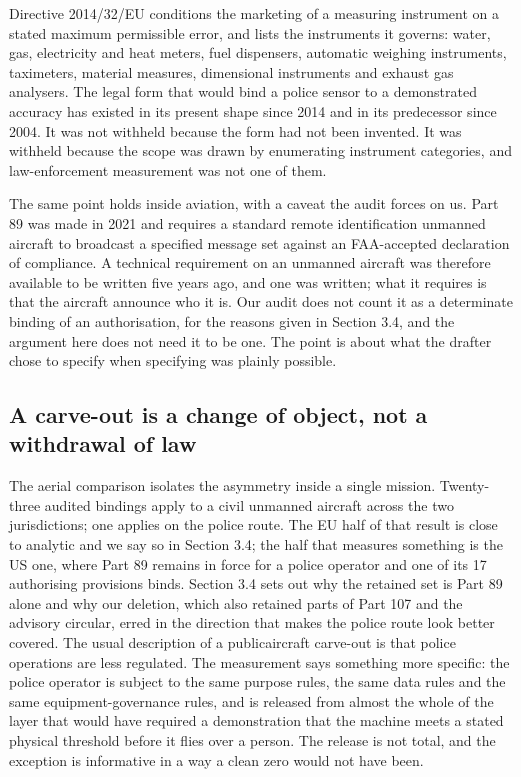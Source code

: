 Directive 2014/32/EU conditions the marketing of a measuring instrument on a stated maximum permissible error, and lists the instruments it governs: water, gas, electricity and heat meters, fuel dispensers, automatic weighing instruments, taximeters, material measures, dimensional instruments and exhaust gas analysers. The legal form that would bind a police sensor to a demonstrated accuracy has existed in its present shape since 2014 and in its predecessor since 2004. It was not withheld because the form had not been invented. It was withheld because the scope was drawn by enumerating instrument categories, and law-enforcement measurement was not one of them.

The same point holds inside aviation, with a caveat the audit forces on us. Part 89 was made in 2021 and requires a standard remote identification unmanned aircraft to broadcast a specified message set against an FAA-accepted declaration of compliance. A technical requirement on an unmanned aircraft was therefore available to be written five years ago, and one was written; what it requires is that the aircraft announce who it is. Our audit does not count it as a determinate binding of an authorisation, for the reasons given in Section 3.4, and the argument here does not need it to be one. The point is about what the drafter chose to specify when specifying was plainly possible.

\subsection{A carve-out is a change of object, not a withdrawal of law}\label{sec:4.3}

The aerial comparison isolates the asymmetry inside a single mission. Twenty-three audited bindings apply to a civil unmanned aircraft across the two jurisdictions; one applies on the police route. The EU half of that result is close to analytic and we say so in Section 3.4; the half that measures something is the US one, where Part 89 remains in force for a police operator and one of its 17 authorising provisions binds. Section 3.4 sets out why the retained set is Part 89 alone and why our deletion, which also retained parts of Part 107 and the advisory circular, erred in the direction that makes the police route look better covered. The usual description of a publicaircraft carve-out is that police operations are less regulated. The measurement says something more specific: the police operator is subject to the same purpose rules, the same data rules and the same equipment-governance rules, and is released from almost the whole of the layer that would have required a demonstration that the machine meets a stated physical threshold before it flies over a person. The release is not total, and the exception is informative in a way a clean zero would not have been.

